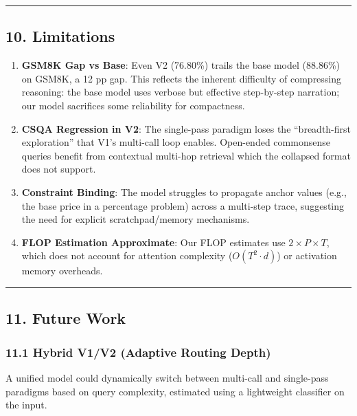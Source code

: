 \begin{center}\rule{0.5\linewidth}{0.5pt}\end{center}

\subsection{10. Limitations}\label{limitations}

\begin{enumerate}
\def\labelenumi{\arabic{enumi}.}
\item
  \textbf{GSM8K Gap vs Base}: Even V2 (76.80\%) trails the base model
  (88.86\%) on GSM8K, a 12 pp gap. This reflects the inherent difficulty
  of compressing reasoning: the base model uses verbose but effective
  step-by-step narration; our model sacrifices some reliability for
  compactness.
\item
  \textbf{CSQA Regression in V2}: The single-pass paradigm loses the
  ``breadth-first exploration'' that V1's multi-call loop enables.
  Open-ended commonsense queries benefit from contextual multi-hop
  retrieval which the collapsed format does not support.
\item
  \textbf{Constraint Binding}: The model struggles to propagate anchor
  values (e.g., the base price in a percentage problem) across a
  multi-step trace, suggesting the need for explicit scratchpad/memory
  mechanisms.
\item
  \textbf{FLOP Estimation Approximate}: Our FLOP estimates use
  \(2 \times P \times T\), which does not account for attention
  complexity (\(O(T^2 \cdot d)\)) or activation memory overheads.
\end{enumerate}

\begin{center}\rule{0.5\linewidth}{0.5pt}\end{center}

\subsection{11. Future Work}\label{future-work}

\subsubsection{11.1 Hybrid V1/V2 (Adaptive Routing
Depth)}\label{hybrid-v1v2-adaptive-routing-depth}

A unified model could dynamically switch between multi-call and
single-pass paradigms based on query complexity, estimated using a
lightweight classifier on the input.

